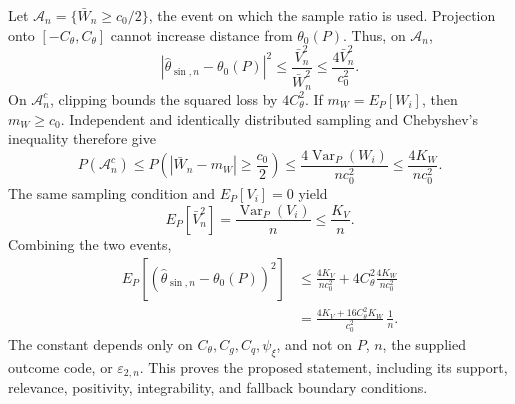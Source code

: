 Let \(\mathcal A_n=\{\bar W_n\ge c_0/2\}\), the event on which the sample ratio is used.  Projection onto \([-C_{\theta},C_{\theta}]\) cannot increase distance from \(\theta_0(P)\).  Thus, on \(\mathcal A_n\),
\[
|\widehat\theta_{\sin,n}-\theta_0(P)|^2
\le\frac{\bar V_n^2}{\bar W_n^2}
\le\frac{4\bar V_n^2}{c_0^2}.
\]
On \(\mathcal A_n^c\), clipping bounds the squared loss by \(4C_{\theta}^2\).  If \(m_W=E_P[W_i]\), then \(m_W\ge c_0\).  Independent and identically distributed sampling and Chebyshev's inequality therefore give
\[
P(\mathcal A_n^c)
\le P\!\left(|\bar W_n-m_W|\ge\frac{c_0}{2}\right)
\le\frac{4\operatorname{Var}_P(W_i)}{nc_0^2}
\le\frac{4K_W}{nc_0^2}.
\]
The same sampling condition and \(E_P[V_i]=0\) yield
\[
E_P[\bar V_n^2]
=\frac{\operatorname{Var}_P(V_i)}{n}
\le\frac{K_V}{n}.
\]
Combining the two events,
\[
\begin{aligned}
E_P[(\widehat\theta_{\sin,n}-\theta_0(P))^2]
&\le\frac{4K_V}{nc_0^2}
+4C_{\theta}^2\frac{4K_W}{nc_0^2}\\
&=\frac{4K_V+16C_{\theta}^2K_W}{c_0^2}\,\frac1n.
\end{aligned}
\]
The constant depends only on \(C_{\theta},C_g,C_q,\psi_{\xi}\), and not on \(P\), \(n\), the supplied outcome code, or \(\varepsilon_{2,n}\).  This proves the proposed statement, including its support, relevance, positivity, integrability, and fallback boundary conditions.